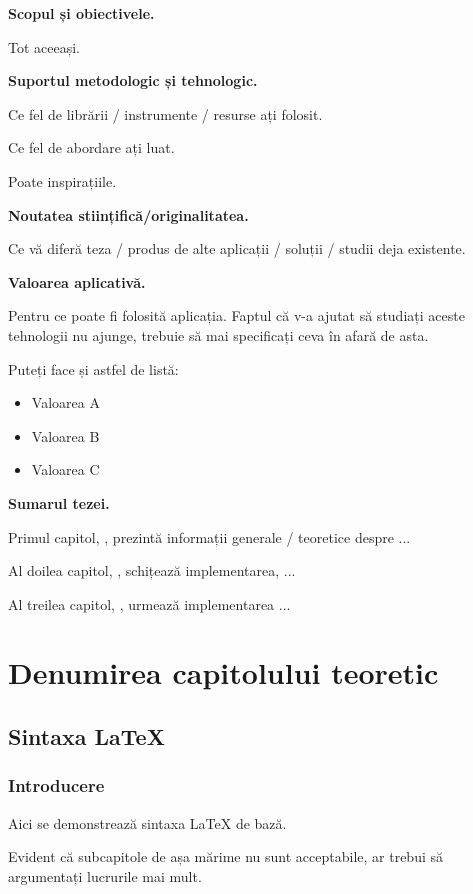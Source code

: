\documentclass[a4paper,12pt]{report}
\begin{document}
\textbf{Scopul și obiectivele.}

Tot aceeași.

\textbf{Suportul metodologic și tehnologic.}

Ce fel de librării / instrumente / resurse ați folosit.

Ce fel de abordare ați luat.

Poate inspirațiile.


\textbf{Noutatea stiințifică/originalitatea.}

Ce vă diferă teza / produs de alte aplicații / soluții / studii deja existente.

\textbf{Valoarea aplicativă.}

Pentru ce poate fi folosită aplicația.
Faptul că v-a ajutat să studiați aceste tehnologii nu ajunge, 
trebuie să mai specificați ceva în afară de asta.

Puteți face și astfel de listă:
\begin{itemize}
    \item Valoarea A
    \item Valoarea B
    \item Valoarea C
\end{itemize}

\textbf{Sumarul tezei.}

Primul capitol, , prezintă informații generale / teoretice despre ...

Al doilea capitol, , schițează implementarea, ...

Al treilea capitol, , urmează implementarea ...

\chapter{Denumirea capitolului teoretic}\label{intro_chapter_title}

\section{Sintaxa \LaTeX{}}

\subsection{Introducere}

Aici se demonstrează sintaxa \LaTeX{} de bază.

Evident că subcapitole de așa mărime nu sunt acceptabile, 
ar trebui să argumentați lucrurile mai mult.
\end{document}
